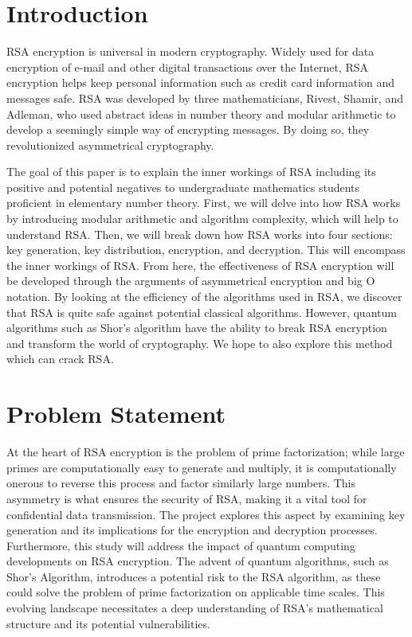 \documentclass{article}
\begin{document}
\section{Introduction}
RSA encryption is universal in modern cryptography. Widely used for data encryption of e-mail and other digital transactions over the Internet, RSA encryption helps keep personal information such as credit card information and messages safe. RSA was developed by three mathematicians, Rivest, Shamir, and Adleman, who used abstract ideas in number theory and modular arithmetic to develop a seemingly simple way of encrypting messages. By doing so, they revolutionized asymmetrical cryptography.

The goal of this paper is to explain the inner workings of RSA including its positive and potential negatives to undergraduate mathematics students proficient in elementary number theory. First, we will delve into how RSA works by introducing modular arithmetic and algorithm complexity, which will help to understand RSA. Then, we will break down how RSA works into four sections: key generation, key distribution, encryption, and decryption. This will encompass the inner workings of RSA. From here, the effectiveness of RSA encryption will be developed through the arguments of asymmetrical encryption and big O notation. By looking at the efficiency of the algorithms used in RSA, we discover that RSA is quite safe against potential classical algorithms. However, quantum algorithms such as Shor's algorithm have the ability to break RSA encryption and transform the world of cryptography. We hope to also explore this method which can crack RSA.

\section{Problem Statement}
At the heart of RSA encryption is the problem of prime factorization; while large primes are computationally easy to generate and multiply, it is computationally onerous to reverse this process and factor similarly large numbers. This asymmetry is what ensures the security of RSA, making it a vital tool for confidential data transmission. The project explores this aspect by examining key generation and its implications for the encryption and decryption processes.
Furthermore, this study will address the impact of quantum computing developments on RSA encryption. The advent of quantum algorithms, such as Shor's Algorithm, introduces a potential risk to the RSA algorithm, as these could solve the problem of prime factorization on applicable time scales. This evolving landscape necessitates a deep understanding of RSA's mathematical structure and its potential vulnerabilities.
\end{document}
